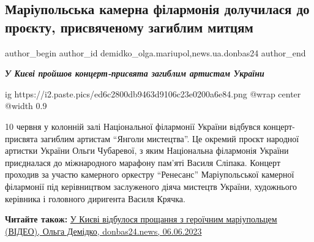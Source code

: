  
 
 
 
 
 
\subsection{Маріупольська камерна філармонія долучилася до проєкту, присвяченому загиблим митцям}
\label{sec:12_06_2023.stz.news.ua.donbas24.1.mariupol_kamerna_filarmonia_proekt_zagybli_mytci}
 
\ifcmt
 author_begin
   author_id demidko_olga.mariupol,news.ua.donbas24
 author_end
\fi

\begin{center}
\Large\bfseries\em\color{blue}
У Києві пройшов концерт-присвята загиблим артистам України
\end{center}

\ifcmt
  ig https://i2.paste.pics/ed6c2800db9463d9106c23e0200a6e84.png
  @wrap center
  @width 0.9
\fi

10 червня у колонній залі Національної філармонії України відбувся
концерт-присвята загиблим артистам \enquote{Янголи мистецтва}. Це окремий проєкт
народної артистки України Ольги Чубаревої, з яким Національна філармонія
України приєдналася до міжнародного марафону пам'яті Василя Сліпака. Концерт
проходив за участю камерного оркестру \enquote{Ренесанс} Маріупольської камерної
філармонії під керівництвом заслуженого діяча мистецтв України, художнього
керівника і головного диригента Василя Крячка. 

\textbf{Читайте також:} \href{https://donbas24.news/news/u-kijevi-vidbulosya-proshhannya-z-geroyicnim-mariupolcem}{У Києві відбулося прощання з героїчним маріупольцем (ВІДЕО), Ольга Демідко, donbas24.news, 06.06.2023}

